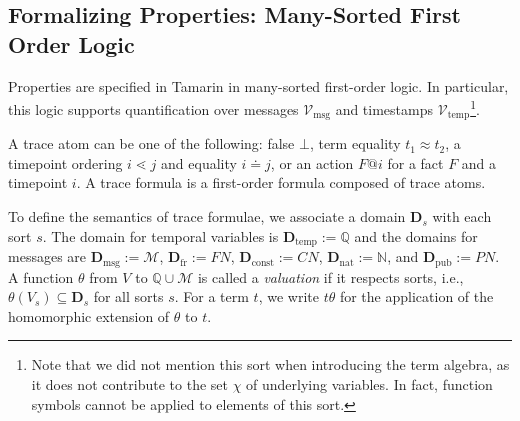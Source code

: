 \subsection{Formalizing Properties: Many-Sorted First Order Logic}
\label{sec:formalizingproperties}
Properties are specified in Tamarin in many-sorted first-order logic. In particular, this logic supports quantification over messages $\mathcal{V}_\text{msg}$ and timestamps $\mathcal{V}_\text{temp}$\footnote{Note that we did not mention this sort when introducing the term algebra, as it does not contribute to the set $\chi$ of underlying variables. In fact, function symbols cannot be applied to elements of this sort.}.

A trace atom can be one of the following: false $\bot$, term equality $t_1 \approx t_2$, a timepoint ordering $i \lessdot j$ and equality $i \doteq j$, or an action $F @ i$ for a fact $F$ and a timepoint $i$. A trace formula is a first-order formula composed of trace atoms.

To define the semantics of trace formulae, we associate a domain $\mathbf{D}_s$ with each sort $s$. The domain for temporal variables is $\mathbf{D}_{\text{temp}} := \mathbb{Q}$ and the domains for messages are $\mathbf{D}_{\text{msg}} := \mathcal{M}$, $\mathbf{D}_{\text{fr}} := FN$, $\mathbf{D}_{\text{const}} := CN$, $\mathbf{D}_{\text{nat}} := \mathbb{N}$, and $\mathbf{D}_{\text{pub}} := PN$. A function $\theta$ from $V$ to $\mathbb{Q} \cup \mathcal{M}$ is called a \textit{valuation} if it respects sorts, i.e., $\theta(V_s) \subseteq \mathbf{D}_s$ for all sorts $s$. For a term $t$, we write $t\theta$ for the application of the homomorphic extension of $\theta$ to $t$.

